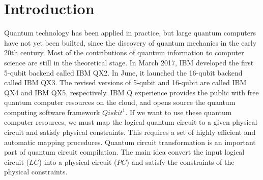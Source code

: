 \documentclass[runningheads]{llncs}
\begin{document}
\section{Introduction}
\label{Introduction}
Quantum technology has been applied in practice, but large quantum computers
have not yet been builted,
since the discovery of quantum mechanics in the early 20th century.
Most of the contributions of quantum 
information to computer science are still in the theoretical stage.
In March 2017, IBM developed the first 5-qubit backend called IBM QX2. 
In June, it launched the 16-qubit backend called IBM QX3. 
The revised versions of 5-qubit and 16-qubit 
are called IBM QX4 and IBM QX5, respectively.
IBM Q experience provides the public with free quantum computer resources on the cloud,
and opens source the quantum computing software framework $Qiskit^{1}$. 
If we want to use these quantum computer resources, 
we must map  the logical quantum circuit to a given physical circuit and 
satisfy physical constraints. This requires a set of highly efficient and 
automatic mapping procedures. Quantum circuit transformation is an important 
part of quantum circuit compilation. The main idea convert the input
logical circuit ($LC$) into a physical circuit ($PC$) and satisfy the constraints of
the physical constraints.
  
\end{document}
